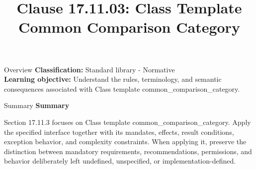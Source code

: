 \documentclass[10pt,letterpaper]{article}
\title{Clause 17.11.03: Class Template Common Comparison Category}
\author{}
\date{}
\begin{document}
\maketitle
\begin{CornellOverviewBox}{Overview}
\textbf{Classification:} Standard library - Normative\\[2pt]
\textbf{Learning objective:} Understand the rules, terminology, and semantic consequences associated with Class template common\_comparison\_category.
\end{CornellOverviewBox}\begin{CornellSummaryBox}{Summary}
{\sffamily\bfseries\color{Accent} Summary}\par\vspace{3pt}Section 17.11.3 focuses on Class template common\_comparison\_category. Apply the specified interface together with its mandates, effects, result conditions, exception behavior, and complexity constraints. When applying it, preserve the distinction between mandatory requirements, recommendations, permissions, and behavior deliberately left undefined, unspecified, or implementation-defined.
\end{CornellSummaryBox}
\end{document}
